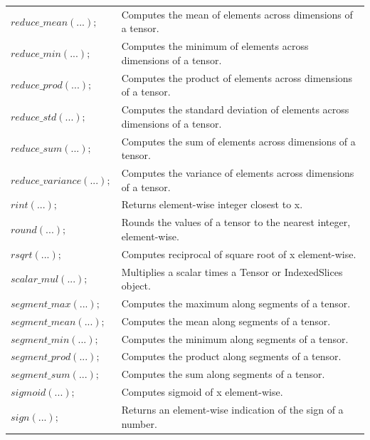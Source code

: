 \documentclass[12pt]{report}
\begin{document}
\begin{longtable}{ p{} | p{}}
$reduce\_mean(...);$ & Computes the mean of elements across dimensions of a tensor. \\ 

$reduce\_min(...);$ & Computes the minimum of elements across dimensions of a tensor. \\ 

$reduce\_prod(...);$ & Computes the product of elements across dimensions of a tensor. \\ 

$reduce\_std(...);$ & Computes the standard deviation of elements across dimensions of a tensor. \\ 

$reduce\_sum(...);$ & Computes the sum of elements across dimensions of a tensor. \\ 

$reduce\_variance(...);$ & Computes the variance of elements across dimensions of a tensor. \\ 

$rint(...);$ & Returns element-wise integer closest to x. \\ 

$round(...);$ & Rounds the values of a tensor to the nearest integer, element-wise. \\ 

$rsqrt(...);$ & Computes reciprocal of square root of x element-wise. \\ 

$scalar\_mul(...);$ & Multiplies a scalar times a Tensor or IndexedSlices object. \\ 

$segment\_max(...);$ & Computes the maximum along segments of a tensor. \\ 

$segment\_mean(...);$ & Computes the mean along segments of a tensor. \\ 

$segment\_min(...);$ & Computes the minimum along segments of a tensor. \\ 

$segment\_prod(...);$ & Computes the product along segments of a tensor. \\ 

$segment\_sum(...);$ & Computes the sum along segments of a tensor. \\ 

$sigmoid(...);$ & Computes sigmoid of x element-wise. \\ 

$sign(...);$ & Returns an element-wise indication of the sign of a number. \\ 


\end{longtable}
\end{document}
